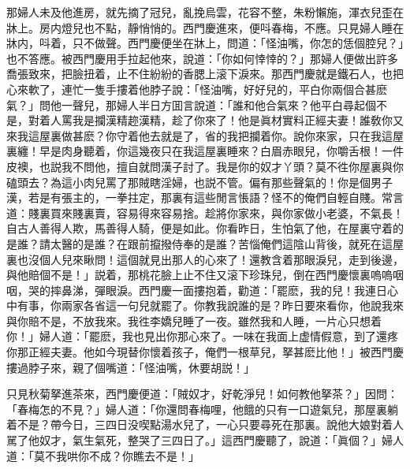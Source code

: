 那婦人未及他進房，就先摘了冠兒，亂挽烏雲，花容不整，朱粉懶施，渾衣兒歪在牀上。房内燈兒也不點，靜悄悄的。西門慶進來，便呌春梅，不應。只見婦人睡在牀内，呌着，只不做聲。西門慶便坐在牀上，問道：「怪油嘴，你怎的恁個腔兒？」也不答應。被西門慶用手拉起他來，說道：「你如何悻悻的？」那婦人便做出許多喬張致來，把臉扭着，止不住紛紛的香腮上滚下淚來。那西門慶就是鐵石人，也把心來軟了，連忙一隻手摟着他脖子說：「怪油嘴，好好兒的，平白你兩個合甚麽氣？」問他一聲兒，那婦人半日方囬言說道：「誰和他合氣來？他平白尋起個不是，對着人罵我是攔漢精趂漢精，趁了你來了！他是眞材實料正經夫妻！誰敎你又來我這屋裏做甚麽？你守着他去就是了，省的我把攔着你。說你來家，只在我這屋裏纏！早是肉身聽着，你這幾夜只在我這屋裏睡來？白眉赤眼兒，你嚼舌根！一件皮襖，也説我不問他，擅自就問漢子討了。我是你的奴才丫頭？莫不徃你屋裏與你磕頭去？為這小肉兒罵了那賊瞎淫婦，也説不管。偏有那些聲氣的！你是個男子漢，若是有張主的，一拳拄定，那裏有這些閒言悵語？怪不的俺們自輕自賤。常言道：賤裏買來賤裏賣，容易得來容易捨。趁將你家來，與你家做小老婆，不氣長！自古人善得人欺，馬善得人騎，便是如此。你看昨日，生怕氣了他，在屋裏守着的是誰？請太醫的是誰？在跟前攛撥侍奉的是誰？苦惱俺們這陰山背後，就死在這屋裏也沒個人兒來瞅問！這個就見出那人的心來了！還教含着那眼淚兒，走到後邊，與他賠個不是！」説着，那桃花臉上止不住又滚下珍珠兒，倒在西門慶懷裏嗚嗚咽咽，哭的摔鼻涕，彈眼淚。西門慶一面摟抱着，勸道：「罷麽，我的兒！我連日心中有事，你兩家各省這一句兒就罷了。你教我說誰的是？昨日要來看你，他說我來與你賠不是，不放我來。我徃李嬌兒睡了一夜。雖然我和人睡，一片心只想着你！」婦人道：「罷麽，我也見出你那心來了。一味在我面上虚情假意，到了還疼你那正經夫妻。他如今現替你懷着孩子，俺們一根草兒，拏甚麽比他！」被西門慶摟過脖子來，親了個嘴道：「怪油嘴，休要胡説！」

只見秋菊拏進茶來，西門慶便道：「賊奴才，好乾淨兒！如何教他拏茶？」因問：「春梅怎的不見？」婦人道：「你還問春梅哩，他餓的只有一口遊氣兒，那屋裏躺着不是？帶今日，三四日没喫點湯水兒了，一心只要尋死在那裏。說他大娘對着人駡了他奴才，氣生氣死，整哭了三四日了。」這西門慶聽了，說道：「眞個？」婦人道：「莫不我哄你不成？你瞧去不是！」

